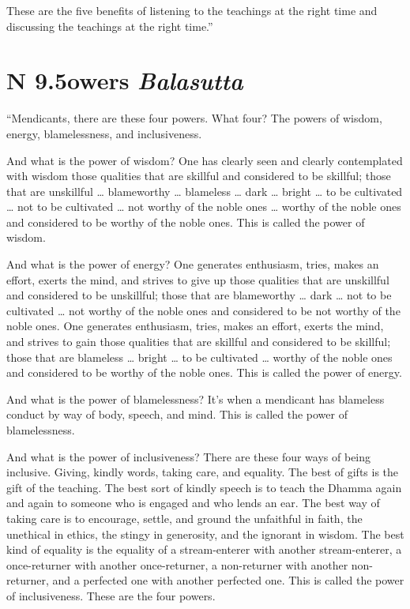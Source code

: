 \documentclass[12pt,openany]{book}%
\newcommand*{\suttatitleacronym}[1]{\smaller[2]{#1}\vspace*{.3em}}
\newcommand*{\suttatitletranslation}[1]{\linebreak{#1}}
\newcommand*{\suttatitleroot}[1]{\linebreak\smaller[2]\itshape{#1}}
\newcommand*{\tocacronym}[1]{\hspace*{-3.3em}{#1}\quad}
\newcommand*{\toctranslation}[1]{#1}
\newcommand*{\tocroot}[1]{(\textit{#1})}
\begin{document}
These are the five benefits of listening to the teachings at the right time and discussing the teachings at the right time.” 

%
\section*{{\suttatitleacronym AN 9.5}{\suttatitletranslation Powers }{\suttatitleroot Balasutta}}
\addcontentsline{toc}{section}{\tocacronym{AN 9.5} \toctranslation{Powers } \tocroot{Balasutta}}

“Mendicants, there are these four powers. What four? The powers of wisdom, energy, blamelessness, and inclusiveness. 

And what is the power of wisdom? One has clearly seen and clearly contemplated with wisdom those qualities that are skillful and considered to be skillful; those that are unskillful … blameworthy … blameless … dark … bright … to be cultivated … not to be cultivated … not worthy of the noble ones … worthy of the noble ones and considered to be worthy of the noble ones. This is called the power of wisdom. 

And what is the power of energy? One generates enthusiasm, tries, makes an effort, exerts the mind, and strives to give up those qualities that are unskillful and considered to be unskillful; those that are blameworthy … dark … not to be cultivated … not worthy of the noble ones and considered to be not worthy of the noble ones. One generates enthusiasm, tries, makes an effort, exerts the mind, and strives to gain those qualities that are skillful and considered to be skillful; those that are blameless … bright … to be cultivated … worthy of the noble ones and considered to be worthy of the noble ones. This is called the power of energy. 

And what is the power of blamelessness? It’s when a mendicant has blameless conduct by way of body, speech, and mind. This is called the power of blamelessness. 

And what is the power of inclusiveness? There are these four ways of being inclusive. Giving, kindly words, taking care, and equality. The best of gifts is the gift of the teaching. The best sort of kindly speech is to teach the Dhamma again and again to someone who is engaged and who lends an ear. The best way of taking care is to encourage, settle, and ground the unfaithful in faith, the unethical in ethics, the stingy in generosity, and the ignorant in wisdom. The best kind of equality is the equality of a stream-enterer with another stream-enterer, a once-returner with another once-returner, a non-returner with another non-returner, and a perfected one with another perfected one. This is called the power of inclusiveness. These are the four powers. 
\end{document}
